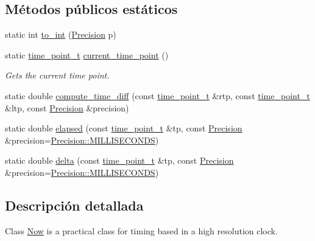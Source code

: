 \subsection*{Métodos públicos estáticos}
\begin{DoxyCompactItemize}
\item 
static int \hyperlink{class_designar_1_1_now_a24c5b1e6f6d2e7d8030fd4b70a9a1b12}{to\+\_\+int} (\hyperlink{class_designar_1_1_now_a3c9f5e57907c88cbe63c70a64638c072}{Precision} p)
\item 
static \hyperlink{namespace_designar_a0edbd598eadb672df2c70e5af4dfccee}{time\+\_\+point\+\_\+t} \hyperlink{class_designar_1_1_now_af862bb15a2202e02e31a1d11fac08dcf}{current\+\_\+time\+\_\+point} ()
\begin{DoxyCompactList}\small\item\em Gets the current time point. \end{DoxyCompactList}\item 
static double \hyperlink{class_designar_1_1_now_aa140dcc748ca53e2c42548d50273bfaa}{compute\+\_\+time\+\_\+diff} (const \hyperlink{namespace_designar_a0edbd598eadb672df2c70e5af4dfccee}{time\+\_\+point\+\_\+t} \&rtp, const \hyperlink{namespace_designar_a0edbd598eadb672df2c70e5af4dfccee}{time\+\_\+point\+\_\+t} \&ltp, const \hyperlink{class_designar_1_1_now_a3c9f5e57907c88cbe63c70a64638c072}{Precision} \&precision)
\item 
static double \hyperlink{class_designar_1_1_now_a04cc67e3245b662b33b25a6eefe7e957}{elapsed} (const \hyperlink{namespace_designar_a0edbd598eadb672df2c70e5af4dfccee}{time\+\_\+point\+\_\+t} \&tp, const \hyperlink{class_designar_1_1_now_a3c9f5e57907c88cbe63c70a64638c072}{Precision} \&precision=\hyperlink{class_designar_1_1_now_a3c9f5e57907c88cbe63c70a64638c072ab4fd5e5c06e72437a57379576df36936}{Precision\+::\+M\+I\+L\+L\+I\+S\+E\+C\+O\+N\+DS})
\item 
static double \hyperlink{class_designar_1_1_now_a413d1f85c9cc6ac8dde02538bce052f2}{delta} (const \hyperlink{namespace_designar_a0edbd598eadb672df2c70e5af4dfccee}{time\+\_\+point\+\_\+t} \&tp, const \hyperlink{class_designar_1_1_now_a3c9f5e57907c88cbe63c70a64638c072}{Precision} \&precision=\hyperlink{class_designar_1_1_now_a3c9f5e57907c88cbe63c70a64638c072ab4fd5e5c06e72437a57379576df36936}{Precision\+::\+M\+I\+L\+L\+I\+S\+E\+C\+O\+N\+DS})
\end{DoxyCompactItemize}


\subsection{Descripción detallada}
Class \hyperlink{class_designar_1_1_now}{Now} is a practical class for timing based in a high resolution clock.

